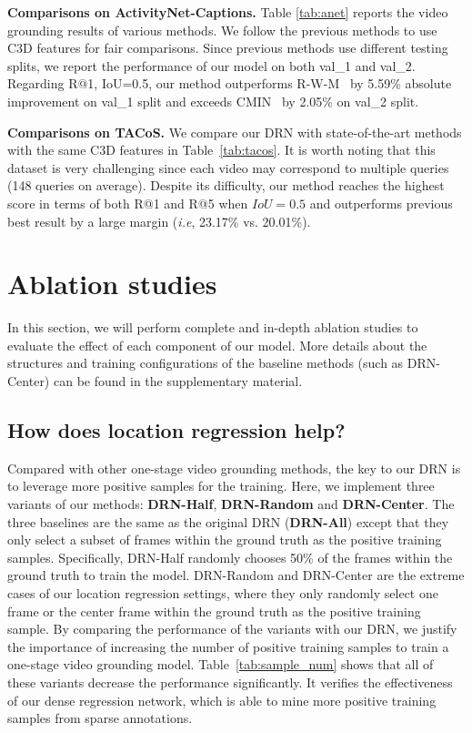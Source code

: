 \documentclass[10pt,twocolumn,letterpaper]{article}
\def\ie{\emph{i.e}\onedot} \def\Ie{\emph{I.e}\onedot}
\begin{document}
	\noindent \textbf{Comparisons on ActivityNet-Captions.} Table \ref{tab:anet} reports the video grounding results of various methods. We follow the previous methods to use C3D features for fair comparisons. Since previous methods use different testing splits, we report the performance of our model on both val\_1 and val\_2.
	Regarding R@1, IoU=0.5, our method outperforms R-W-M~\cite{he2019read} by 5.59\% absolute improvement on val\_1 split and exceeds CMIN~\cite{zhang2019cross} by 2.05\% on val\_2 split.  
	
	\noindent \textbf{Comparisons on TACoS.} We compare our DRN with state-of-the-art methods with the same C3D features in Table~\ref{tab:tacos}. It is worth noting that this dataset is very challenging since each video may correspond to multiple queries (148 queries on average). Despite its difficulty, our method reaches the highest score in terms of both R@1 and R@5 when $IoU=0.5$ and outperforms previous best result by a large margin (\ie, 23.17\% vs. 20.01\%).


	
	\section{Ablation studies}
	\label{sec:ablation}
	
	In this section, we will perform complete and in-depth
	ablation studies to evaluate the effect of each component of our model. More details about the structures and training configurations of the baseline methods (such as DRN-Center) can be found in the supplementary material.
	
	\subsection{How does location regression help?}
	\label{sec:ablation_DRN}
	
	Compared with other one-stage video grounding methods, the key to our DRN is to leverage more positive samples for the training. Here, we implement three variants of our methods: \textbf{DRN-Half}, \textbf{DRN-Random} and \textbf{DRN-Center}. The three baselines are the same as the original DRN (\textbf{DRN-All}) except that they only select a subset of frames within the ground truth as the positive training samples. Specifically, DRN-Half randomly chooses 50\% of the frames within the ground truth to train the model. DRN-Random and DRN-Center are the extreme cases of our location regression settings, where they only randomly select one frame or the center frame within the ground truth as the positive training sample. By comparing the performance of the variants with our DRN, we justify the importance of increasing the number of positive training samples to train a one-stage video grounding model.
	Table~\ref{tab:sample_num} shows that all of these variants decrease the performance significantly. It verifies the effectiveness of our dense regression network, which is able to mine more positive training samples from sparse annotations.
	
\end{document}
